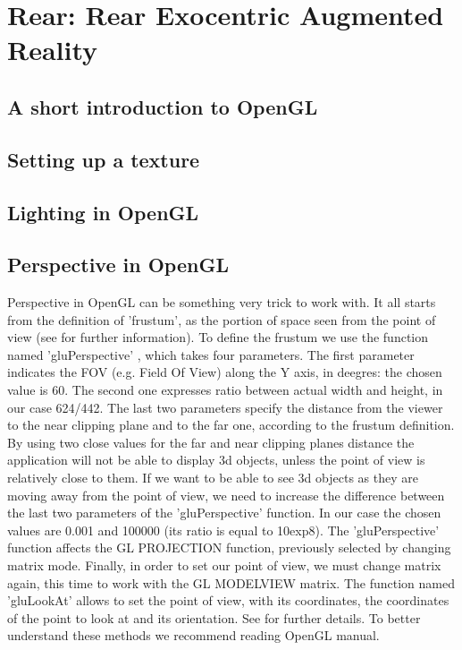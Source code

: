 \section{Rear: Rear Exocentric Augmented Reality}
\label{sec:rear}

\subsection{A short introduction to OpenGL}
\subsection{Setting up a texture}
\subsection{Lighting in OpenGL}
\subsection{Perspective in OpenGL}

Perspective in OpenGL can be something very trick to work with. It all starts from the definition of 'frustum', as the portion
of space seen from the point of view (see \cite{wiki:frustum} for further information). To define the frustum we use the function
named 'gluPerspective' \cite{opengl:gluPerspective}, which takes four parameters.
\newline The first parameter indicates the FOV (e.g. Field Of View) along the Y axis, in deegres: the chosen value is 60. The
second one expresses ratio between actual width and height, in our case 624/442. The last two parameters specify the distance from
the viewer to the near clipping plane and to the far one, according to the frustum definition.
\newline By using two close values for the far and near clipping planes distance the application will not be able to display 3d
objects, unless the point of view is relatively close to them. If we want to be able to see 3d objects as they are moving away
from the point of view, we need to increase the difference between the last two parameters of the 'gluPerspective' function. In
our case the chosen values are 0.001 and 100000 (its ratio is equal to 10exp8).
\newline The 'gluPerspective' function affects the GL PROJECTION function, previously selected by changing matrix mode. Finally,
in order to set our point of view, we must change matrix again, this time to work with the GL MODELVIEW matrix. The function named
'gluLookAt' allows to set the point of view, with its coordinates, the coordinates of the point to look at and its orientation.
See \cite{opengl:gluLookAt} for further details.
\newline To better understand these methods we recommend reading OpenGL manual.


